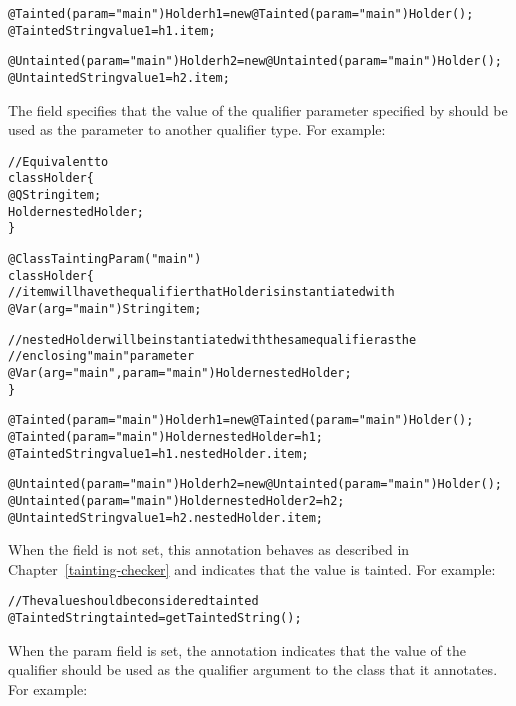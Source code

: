 \begin{description}
\begin{alltt}
  @Tainted(param="main") Holder h1 = new @Tainted(param="main") Holder();
  @Tainted String value1 = h1.item;

  @Untainted(param="main") Holder h2 = new @Untainted(param="main") Holder();
  @Untainted String value1 = h2.item;

\end{alltt}

The  field specifies that the value of the
qualifier parameter specified by  should be used as the parameter
to another qualifier type. For example:

\begin{alltt}

  // Equivalent to
  class Holder  \{
    @Q String item;
    Holder nestedHolder;
  \}

  @ClassTaintingParam ("main")
  class Holder \{
    // item will have the qualifier that Holder is instantiated with
    @Var(arg="main") String item;

    // nestedHolder will be instantiated with the same qualifier as the
    // enclosing "main" parameter
    @Var(arg="main", param="main") Holder nestedHolder;
  \}

  @Tainted(param="main") Holder h1 = new @Tainted(param="main") Holder();
  @Tainted(param="main") Holder nestedHolder = h1;
  @Tainted String value1 = h1.nestedHolder.item;

  @Untainted(param="main") Holder h2 = new @Untainted(param="main") Holder();
  @Untainted(param="main") Holder nestedHolder2 = h2;
  @Untainted String value1 = h2.nestedHolder.item;

\end{alltt}

\item[\refqualclass{checker/tainting/qual}{Tainted}]
When the  field is not set, this annotation behaves as described in
Chapter~\ref{tainting-checker} and indicates that the value is tainted.
For example:

\begin{alltt}
  // The value should be considered tainted
  @Tainted String tainted  = getTaintedString();
\end{alltt}

When the  param field is set, the annotation indicates that the
value of the  qualifier should be used as the qualifier
argument to the class that it annotates. For example:

\begin{alltt}


\end{alltt}
\end{description}
